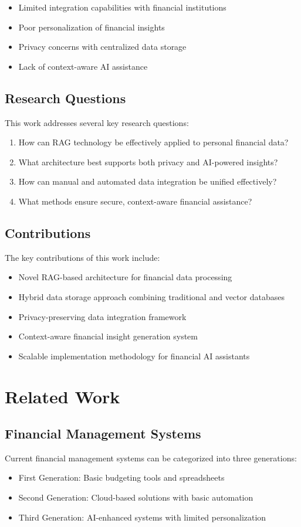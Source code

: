 \documentclass[conference]{IEEEtran}
\begin{document}
\begin{itemize}
\item Limited integration capabilities with financial institutions
\item Poor personalization of financial insights
\item Privacy concerns with centralized data storage
\item Lack of context-aware AI assistance
\end{itemize}

\subsection{Research Questions}
This work addresses several key research questions:
\begin{enumerate}
\item How can RAG technology be effectively applied to personal financial data?
\item What architecture best supports both privacy and AI-powered insights?
\item How can manual and automated data integration be unified effectively?
\item What methods ensure secure, context-aware financial assistance?
\end{enumerate}

\subsection{Contributions}
The key contributions of this work include:
\begin{itemize}
\item Novel RAG-based architecture for financial data processing
\item Hybrid data storage approach combining traditional and vector databases
\item Privacy-preserving data integration framework
\item Context-aware financial insight generation system
\item Scalable implementation methodology for financial AI assistants
\end{itemize}

\section{Related Work}
\subsection{Financial Management Systems}
Current financial management systems can be categorized into three generations:
\begin{itemize}
\item First Generation: Basic budgeting tools and spreadsheets
\item Second Generation: Cloud-based solutions with basic automation
\item Third Generation: AI-enhanced systems with limited personalization
\end{itemize}
\end{document}
